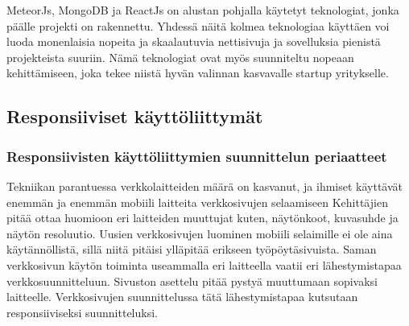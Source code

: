\documentclass[11pt,a4paper,titlepage,oneside]{article}
\begin{document}
MeteorJs, MongoDB ja ReactJs on alustan pohjalla käytetyt teknologiat, jonka päälle projekti on rakennettu.
Yhdessä näitä kolmea teknologiaa käyttäen voi luoda monenlaisia nopeita ja skaalautuvia nettisivuja ja sovelluksia pienistä projekteista suuriin.
Nämä teknologiat ovat myös suunniteltu nopeaan kehittämiseen, joka tekee niistä hyvän valinnan kasvavalle startup yritykselle.
\medskip









\newpage
{}                %




\newpage
{}%






\newpage
{}        %













\newpage
\subsection{Responsiiviset käyttöliittymät}        %




\subsubsection{Responsiivisten käyttöliittymien suunnittelun periaatteet}




Tekniikan parantuessa verkkolaitteiden määrä on kasvanut, ja ihmiset käyttävät enemmän ja enemmän mobiili laitteita verkkosivujen selaamiseen 
Kehittäjien pitää ottaa huomioon eri laitteiden muuttujat kuten, näytönkoot, kuvasuhde ja näytön resoluutio.
Uusien verkkosivujen luominen mobiili selaimille ei ole aina käytännöllistä, sillä niitä pitäisi ylläpitää erikseen työpöytäsivuista.
Saman verkkosivun käytön toiminta useammalla eri laitteella vaatii eri lähestymistapaa verkkosuunnitteluun. 
Sivuston asettelu pitää pystyä muuttumaan sopivaksi laitteelle.
Verkkosivujen suunnittelussa tätä lähestymistapaa kutsutaan responsiiviseksi suunnitteluksi. 
\medskip
\end{document}
